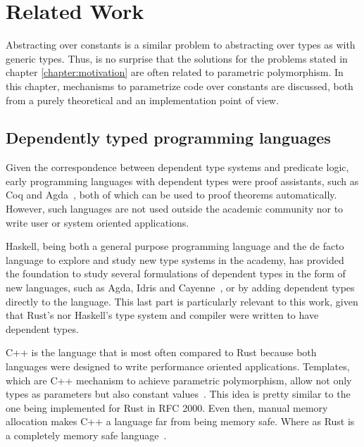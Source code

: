 \newcommand{\pdtn}[1] { \langle \text{#1} \rangle }

\chapter{Related Work}

\label{chapter:related_work}

Abstracting over constants is a similar problem to abstracting over types as
with generic types. Thus, is no surprise that the solutions for the problems
stated in chapter \ref{chapter:motivation} are often related to parametric
polymorphism. In this chapter, mechanisms to parametrize code over constants are
discussed, both from a purely theoretical and an implementation point of view.

\section{Dependently typed programming languages}

Given the correspondence between dependent type systems and predicate logic,
early programming languages with dependent types were proof assistants, such as
Coq and Agda~\cite{agda}, both of which can be used to proof theorems
automatically.  However, such languages are not used outside the academic
community nor to write user or system oriented applications.

Haskell, being both a general purpose programming language and the de facto
language to explore and study new type systems in the academy, has provided the
foundation to study several formulations of dependent types in the form of new
languages, such as Agda, Idris \cite{idris} and Cayenne~\cite{cayenne}, or by
adding dependent types directly to the language. This last part is particularly
relevant to this work, given that Rust's nor Haskell's type system and compiler
were written to have dependent types.

C++ is the language that is most often compared to Rust because both languages
were designed to write performance oriented applications. Templates, which are
C++ mechanism to achieve parametric polymorphism, allow not only types as
parameters but also constant values~\cite{templates}. This idea is pretty
similar to the one being implemented for Rust in RFC 2000. Even then, manual
memory allocation makes C++ a language far from being memory safe. Where as Rust
is a completely memory safe language~\cite{ralf}.    

